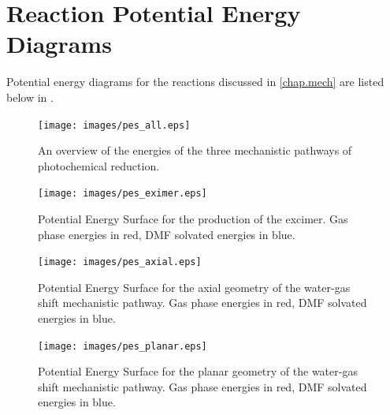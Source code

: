 \chapter{Reaction Potential Energy Diagrams} \label{app.energy}

Potential energy diagrams for the reactions discussed in \autoref{chap.mech} are listed below in . 

\begin{landscape}

\begin{figure}[!htbp]
 \begin{center}
  \texttt{[image: images/pes\_all.eps]}
 \end{center}
\caption[An overview of the energies of the three mechanistic pathways of photochemical  reduction.]{An overview of the energies of the three mechanistic pathways of photochemical  reduction.}
\label{fig.apes_all}
\end{figure}

\begin{figure}[!htbp]
 \begin{center}
  \texttt{[image: images/pes\_eximer.eps]}
 \end{center}
\caption[Potential Energy Surface for the production of the excimer.]{Potential Energy Surface for the production of the excimer. Gas phase energies in red, DMF solvated energies in blue.}
\label{fig.apes_eximer}
\end{figure}

 
\begin{figure}[!htbp]
 \begin{center}
  \texttt{[image: images/pes\_axial.eps]}
 \end{center}
\caption[Potential Energy Surface for the axial geometry of the water-gas shift mechanistic pathway.]{Potential Energy Surface for the axial geometry of the water-gas shift mechanistic pathway. Gas phase energies in red, DMF solvated energies in blue.}
\label{fig.apes_axial}
\end{figure} 

\begin{figure}[!htbp]
 \begin{center}
  \texttt{[image: images/pes\_planar.eps]}
 \end{center}
\caption[Potential Energy Surface for the planar geometry of the water-gas shift mechanistic pathway.]{Potential Energy Surface for the planar geometry of the water-gas shift mechanistic pathway. Gas phase energies in red, DMF solvated energies in blue.}
\label{fig.apes_planar}
\end{figure} 


\end{landscape}
